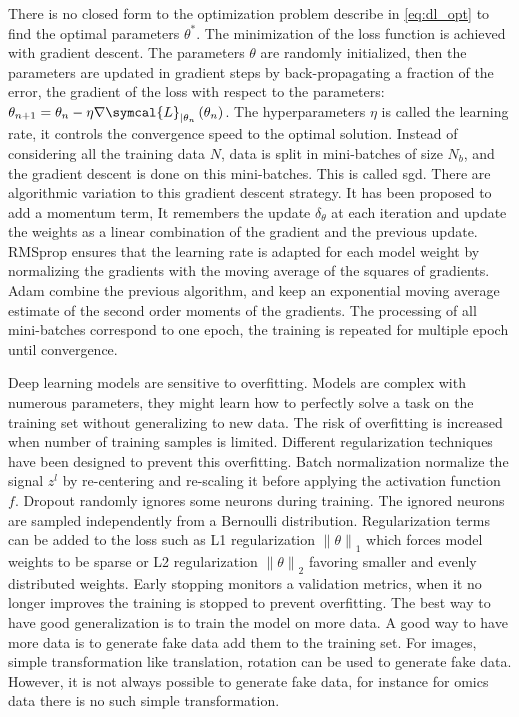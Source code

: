 \documentclass[../main.tex]{subfiles}
\begin{document}
	 There is no closed form to the optimization problem describe in \cref{eq:dl_opt} to find the optimal parameters \(\theta^{*}\).
	 The minimization of the loss function is achieved with gradient descent.
	 The parameters \(\theta\) are randomly initialized, then the parameters are updated in gradient steps by back-propagating a fraction of the error, \ie{}the gradient of the loss with respect to the parameters: \(\theta_{n+1} = \theta_{n} - \eta \nabla \symcal{L}_{|\theta_n}\left(\theta_{n}\right)\).
	 The hyperparameters \(\eta\) is called the learning rate, it controls the convergence speed to the optimal solution.
	 Instead of considering all the training data \(N\), data is split in mini-batches of size \(N_b\), and the gradient descent is done on this mini-batches.
	 This is called \gls{sgd}.
	 There are algorithmic variation to this gradient descent strategy.
	 It has been proposed to add a momentum term, It remembers the update \(\delta_{\theta}\) at each iteration and update the weights as a linear combination of the gradient and the previous update.
	 RMSprop ensures that the learning rate is adapted for each model weight by normalizing the gradients with the moving average of the squares of gradients.
	 Adam combine the previous algorithm, and keep an exponential moving average estimate of the second order moments of the gradients.
	 The processing of all mini-batches correspond to one epoch, the training is repeated for multiple epoch until convergence.


	 Deep learning models are sensitive to overfitting.
	 Models are complex with numerous parameters, they might learn how to perfectly solve a task on the training set without generalizing to new data.
	 The risk of overfitting is increased when number of training samples is limited.
	 Different regularization techniques have been designed to prevent this overfitting.
	 Batch normalization normalize the signal \(z^{l}\) by re-centering and re-scaling it before applying the activation function \(f\).
	 Dropout randomly ignores some neurons during training.
	 The ignored neurons are sampled independently from a Bernoulli distribution.
	 Regularization terms can be added to the loss such as L1 regularization \({\|\theta\|}_{1}\) which forces model weights to be sparse or L2 regularization \({\|\theta\|}_{2}\) favoring smaller and evenly distributed weights.
	 Early stopping monitors a validation metrics, when it no longer improves the training is stopped to prevent overfitting.
	 The best way to have good generalization is to train the model on more data.
	 A good way to have more data is to generate fake data add them to the training set.
	 For images, simple transformation like translation, rotation can be used to generate fake data.
	 However, it is not always possible to generate fake data, for instance for omics data there is no such simple transformation.
\end{document}
